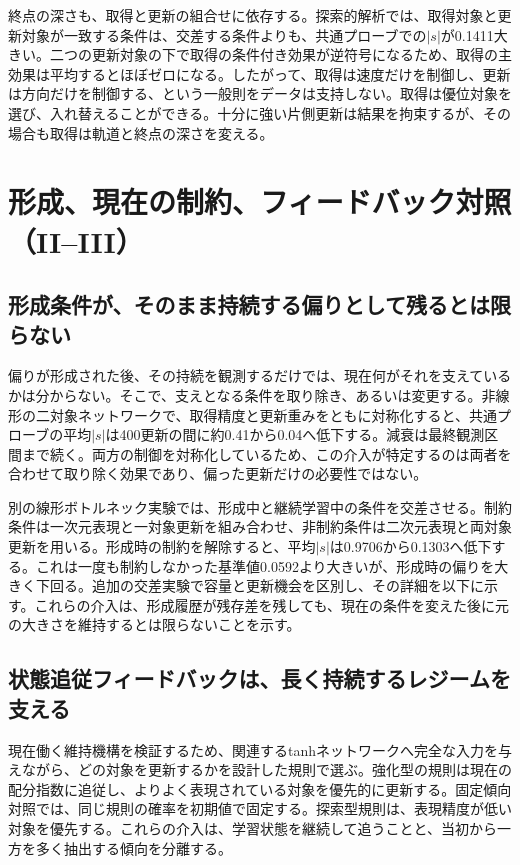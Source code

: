 終点の深さも、取得と更新の組合せに依存する。探索的解析では、取得対象と更新対象が一致する条件は、交差する条件よりも、共通プローブでの$|s|$が0.1411大きい。二つの更新対象の下で取得の条件付き効果が逆符号になるため、取得の主効果は平均するとほぼゼロになる。したがって、取得は速度だけを制御し、更新は方向だけを制御する、という一般則をデータは支持しない。取得は優位対象を選び、入れ替えることができる。十分に強い片側更新は結果を拘束するが、その場合も取得は軌道と終点の深さを変える。


\section{形成、現在の制約、フィードバック対照（II--III）}
\label{app:maintenance}
\label{sec:maintenance}
\subsection{形成条件が、そのまま持続する偏りとして残るとは限らない}
偏りが形成された後、その持続を観測するだけでは、現在何がそれを支えているかは分からない。そこで、支えとなる条件を取り除き、あるいは変更する。非線形の二対象ネットワークで、取得精度と更新重みをともに対称化すると、共通プローブの平均$|s|$は400更新の間に約0.41から0.04へ低下する。減衰は最終観測区間まで続く。両方の制御を対称化しているため、この介入が特定するのは両者を合わせて取り除く効果であり、偏った更新だけの必要性ではない。

別の線形ボトルネック実験では、形成中と継続学習中の条件を交差させる。制約条件は一次元表現と一対象更新を組み合わせ、非制約条件は二次元表現と両対象更新を用いる。形成時の制約を解除すると、平均$|s|$は0.9706から0.1303へ低下する。これは一度も制約しなかった基準値0.0592より大きいが、形成時の偏りを大きく下回る。追加の交差実験で容量と更新機会を区別し、その詳細を以下に示す。これらの介入は、形成履歴が残存差を残しても、現在の条件を変えた後に元の大きさを維持するとは限らないことを示す。

\subsection{状態追従フィードバックは、長く持続するレジームを支える}
現在働く維持機構を検証するため、関連するtanhネットワークへ完全な入力を与えながら、どの対象を更新するかを設計した規則で選ぶ。強化型の規則は現在の配分指数に追従し、よりよく表現されている対象を優先的に更新する。固定傾向対照では、同じ規則の確率を初期値で固定する。探索型規則は、表現精度が低い対象を優先する。これらの介入は、学習状態を継続して追うことと、当初から一方を多く抽出する傾向を分離する。

